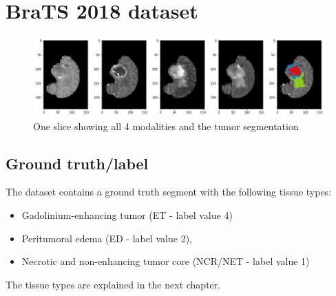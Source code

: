 \section{BraTS 2018 dataset}

\begin{figure}[H]
\centering
\includegraphics[width=14cm]{chapters/04_segmentation/images/brats.png}
\caption{One slice showing all 4 modalities and the tumor segmentation}
\end{figure}

\subsection{Ground truth/label}
The dataset contains a ground truth segment with the following tissue types:

\begin{itemize}
    \item Gadolinium-enhancing tumor (ET - label value 4)
    \item Peritumoral edema (ED - label value 2),
    \item Necrotic and non-enhancing tumor core (NCR/NET - label value 1)
\end{itemize}

The tissue types are explained in the next chapter.